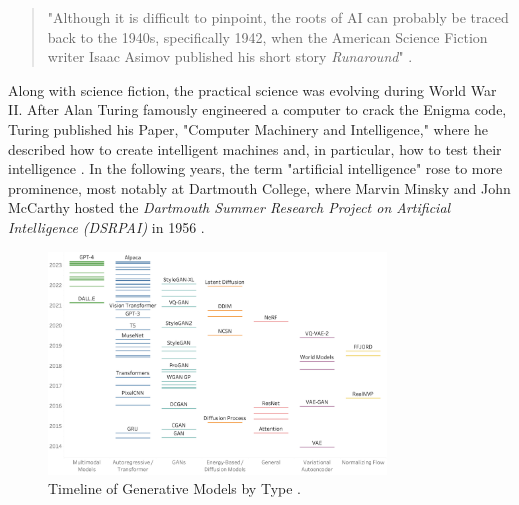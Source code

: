 \documentclass[
  a4paper,  %
  twoside,  %
  bibliography=totoc,
  headsepline,
  cleardoublepage=empty,
  parskip=half,
  draft=false
]{scrbook}
\begin{document}
\begin{quotation}
"Although it is difficult to pinpoint, the roots of AI can probably be traced back to the 1940s, specifically 1942, when the American Science Fiction writer Isaac Asimov published his short story \textit{Runaround}" \cite{haenleinBriefHistoryArtificial2019}. 
\end{quotation}

Along with science fiction, the practical science was evolving during World War II. After Alan Turing famously engineered a computer to crack the Enigma code, Turing published his Paper, "Computer Machinery and Intelligence," where he described how to create intelligent machines and, in particular, how to test their intelligence \cite{turingCOMPUTINGMACHINERYINTELLIGENCE1950}. In the following years, the term "artificial intelligence" rose to more prominence, most notably at Dartmouth College, where Marvin Minsky and John McCarthy hosted the \textit{Dartmouth Summer Research Project on Artificial Intelligence (DSRPAI)} in 1956 \cite{flasinskiHistoryArtificialIntelligence2016}. 

\begin{figure}[h]
  \centering
  \includegraphics[width=0.8\textwidth]{./graphics/Timeline_of_generative_models_by_type.png}
  \caption{Timeline of Generative Models by Type \citet{garcia-penalvoWhatWeMean2023}.}
  \label{fig:timeline-models}
\end{figure}
\end{document}
